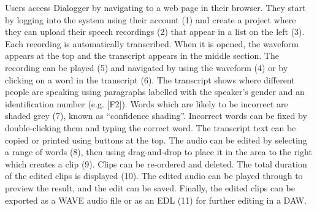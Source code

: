 Users access Dialogger by navigating to a web page in their browser. They start by logging into the system using their
account (1) and create a project where they can upload their speech recordings (2) that appear in a list on the left
(3). Each recording is automatically transcribed. When it is opened, the waveform appears at the top and the transcript
appears in the middle section.  The recording can be played (5) and navigated by using the waveform (4) or by clicking
on a word in the transcript (6). The transcript shows where different people are speaking using paragraphs labelled
with the speaker's gender and an identification number (e.g. [F2]). Words which are likely to be incorrect are shaded
grey (7), known as ``confidence shading''.  Incorrect words can be fixed by double-clicking them and typing the correct
word.  The transcript text can be copied or printed using buttons at the top. The audio can be edited by selecting a
range of words (8), then using drag-and-drop to place it in the area to the right which creates a clip (9).  Clips can
be re-ordered and deleted. The total duration of the edited clips is displayed (10). The edited audio can be played
through to preview the result, and the edit can be saved. Finally, the edited clips can be exported as a WAVE audio
file or as an EDL (11) for further editing in a DAW.




